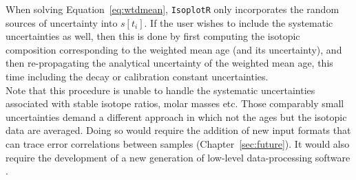 \begin{refsection}
When solving Equation~\ref{eq:wtdmean}, \texttt{IsoplotR} only
incorporates the random sources of uncertainty into $s[t_i]$.  If the
user wishes to include the systematic uncertainties as well, then this
is done by first computing the isotopic composition corresponding to
the weighted mean age (and its uncertainty), and then re-propagating
the analytical uncertainty of the weighted mean age, this time
including the decay or calibration constant uncertainties.\\

Note that this procedure is unable to handle the systematic
uncertainties associated with stable isotope ratios, molar masses
etc. Those comparably small uncertainties demand a different approach
in which not the ages but the isotopic data are averaged.  Doing so
would require the addition of new input formats that can trace error
correlations between samples (Chapter~\ref{sec:future}). It would also
require the development of a new generation of low-level
data-processing software \citep{vermeesch2015b,mclean2016}.

\printbibliography[heading=subbibliography]

\end{refsection}
